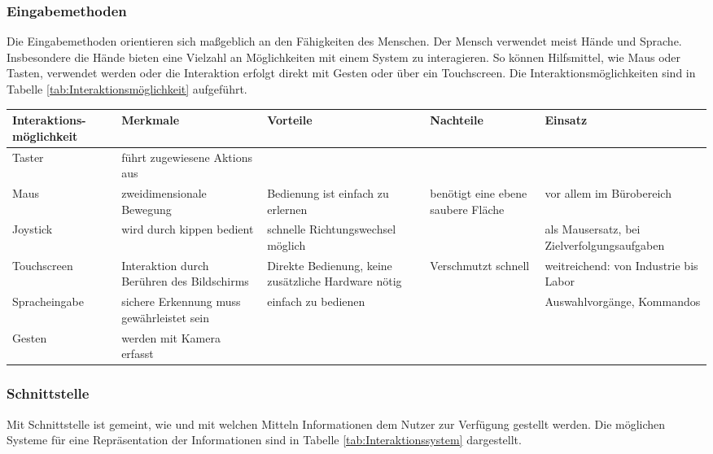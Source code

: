\subsubsection*{Eingabemethoden}
Die Eingabemethoden orientieren sich maßgeblich an den Fähigkeiten des Menschen. Der Mensch verwendet meist Hände und Sprache. Insbesondere die Hände bieten eine Vielzahl an Möglichkeiten mit einem System zu interagieren. So können Hilfsmittel, wie Maus oder Tasten, verwendet werden oder die Interaktion erfolgt direkt mit Gesten oder über ein Touchscreen. Die Interaktionsmöglichkeiten sind in Tabelle \ref{tab:Interaktionsmöglichkeit} aufgeführt. \cite{Zuhlke2012}

\begin{sidewaystable}[ph!]
\begin{tabular}{p{3cm}|p{4cm}|p{4cm}|p{3cm}|p{3cm}}
	\textbf{Interaktions-möglichkeit} & \textbf{Merkmale} & \textbf{Vorteile} & \textbf{Nachteile} & \textbf{Einsatz} \\
	\hline
	Taster & führt zugewiesene Aktions aus & & & \\
	\hline
	Maus & zweidimensionale Bewegung & Bedienung ist einfach zu erlernen & benötigt eine ebene saubere Fläche & vor allem im Bürobereich\\
	\hline
	Joystick & wird durch kippen bedient & schnelle Richtungswechsel möglich & & als Mausersatz, bei Zielverfolgungsaufgaben \\
	\hline
	Touchscreen & Interaktion durch Berühren des Bildschirms & Direkte Bedienung, keine zusätzliche Hardware nötig & Verschmutzt schnell & weitreichend: von Industrie bis Labor \\
	\hline
	Spracheingabe & sichere Erkennung muss gewährleistet sein & einfach zu bedienen & & Auswahlvorgänge, Kommandos \\
	\hline
	Gesten & werden mit Kamera erfasst & & & \\
	\hline
\end{tabular}
\label{tab:Interaktionsmöglichkeit}
\caption{Interaktionsmöglichkeiten mit einem Assistenzsystem}
\end{sidewaystable}

\subsubsection*{Schnittstelle}
Mit Schnittstelle ist gemeint, wie und mit welchen Mitteln Informationen dem Nutzer zur Verfügung gestellt werden. Die möglichen Systeme für eine Repräsentation der Informationen sind in Tabelle \ref{tab:Interaktionssystem} dargestellt. \cite{Zuhlke2012, Kasselmann2016, Weidner2016}

